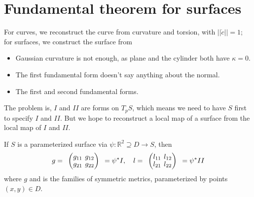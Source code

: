 \documentclass[10pt]{article}
\begin{document}
    
        \section{Fundamental theorem for surfaces}
            For curves, we reconstruct the curve from curvature and torsion, with $||\dot{c}|| = 1$; for surfaces, we construct the surface from
            \begin{itemize}
                \item Gaussian curvature is not enough, as plane and the cylinder both have $\kappa = 0$.
                \item The first fundamental form doesn't say anything about the normal.
                \item The first and second fundamental forms.
            \end{itemize}

            The problem is, $I$ and $II$ are forms on $T_pS$, which means we need to have $S$ first to specify $I$ and $II$. But we hope to reconstruct a local map of a surface from the local map of $I$ and $II$.

            \begin{definition}
                If $S$ is a parameterized surface via $\psi: \mathbb{R}^2\supseteq D\rightarrow S$, then
                \begin{equation*}
                    \begin{aligned}
                        g =
                        \begin{array}{lc}
                            \setlength{\arraycolsep}{2pt}
                            \begingroup
                            \renewcommand*{\arraystretch}{0.89}
                            \begin{pmatrix}
                                g_{11} & g_{12} \\
                                g_{21} & g_{22} \\
                            \end{pmatrix}
                            \endgroup
                        \end{array} = \psi^*I, \quad l = 
                        \begin{array}{lc}
                            \setlength{\arraycolsep}{2pt}
                            \begingroup
                            \renewcommand*{\arraystretch}{0.89}
                            \begin{pmatrix}
                                l_{11} & l_{12} \\
                                l_{21} & l_{22} \\
                            \end{pmatrix}
                            \endgroup
                        \end{array} = \psi^*II
                    \end{aligned}
                \end{equation*}
                where $g$ and is the families of symmetric metrics, parameterized by points $(x, y)\in D$.
            \end{definition}
            
\end{document}

